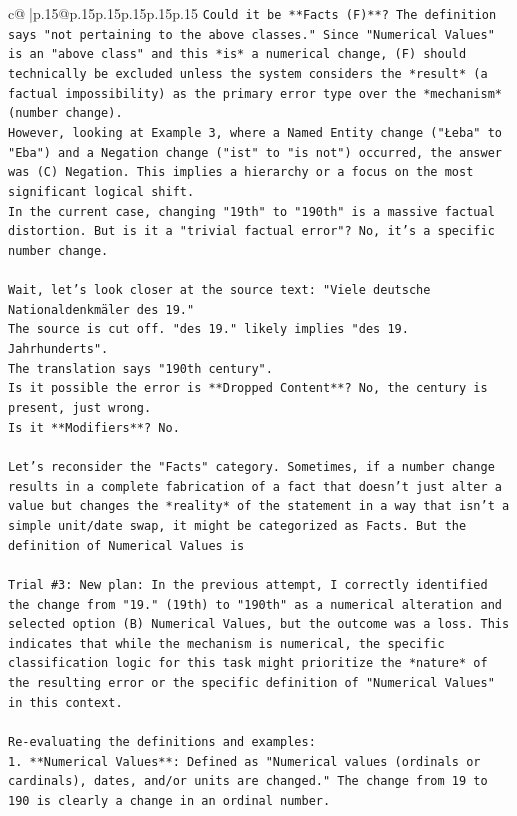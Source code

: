\documentclass{article}
\begin{document}
{\begin{supertabular}{c@{$\;$}|p{.15\linewidth}@{}p{.15\linewidth}p{.15\linewidth}p{.15\linewidth}p{.15\linewidth}p{.15\linewidth}}
{{{\texttt{Could it be **Facts (F)**? The definition says "not pertaining to the above classes." Since "Numerical Values" is an "above class" and this *is* a numerical change, (F) should technically be excluded unless the system considers the *result* (a factual impossibility) as the primary error type over the *mechanism* (number change).} \\
\texttt{However, looking at Example 3, where a Named Entity change ("Łeba" to "Eba") and a Negation change ("ist" to "is not") occurred, the answer was (C) Negation. This implies a hierarchy or a focus on the most significant logical shift.} \\
\texttt{In the current case, changing "19th" to "190th" is a massive factual distortion. But is it a "trivial factual error"? No, it's a specific number change.} \\
\\ 
\texttt{Wait, let's look closer at the source text: "Viele deutsche Nationaldenkmäler des 19."} \\
\texttt{The source is cut off. "des 19." likely implies "des 19. Jahrhunderts".} \\
\texttt{The translation says "190th century".} \\
\texttt{Is it possible the error is **Dropped Content**? No, the century is present, just wrong.} \\
\texttt{Is it **Modifiers**? No.} \\
\\ 
\texttt{Let's reconsider the "Facts" category. Sometimes, if a number change results in a complete fabrication of a fact that doesn't just alter a value but changes the *reality* of the statement in a way that isn't a simple unit/date swap, it might be categorized as Facts. But the definition of Numerical Values is} \\
\\ 
\texttt{Trial \#3: New plan: In the previous attempt, I correctly identified the change from "19." (19th) to "190th" as a numerical alteration and selected option (B) Numerical Values, but the outcome was a loss. This indicates that while the mechanism is numerical, the specific classification logic for this task might prioritize the *nature* of the resulting error or the specific definition of "Numerical Values" in this context.} \\
\\ 
\texttt{Re{-}evaluating the definitions and examples:} \\
\texttt{1.  **Numerical Values**: Defined as "Numerical values (ordinals or cardinals), dates, and/or units are changed." The change from 19 to 190 is clearly a change in an ordinal number.} \\
}}}
\end{supertabular}}
\end{document}
